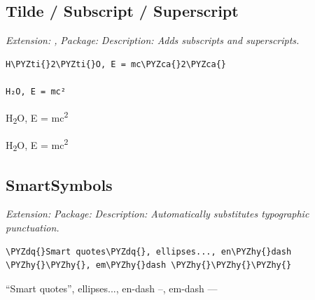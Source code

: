 \documentclass[a4paper,twoside]{article}
\begin{document}
\subsection{Tilde / Subscript / Superscript}
\emph{Extension: , }
\emph{Package: }
\emph{Description: Adds subscripts and superscripts.}
\begin{tscode}[lang=md, engine=pygments]
\begin{Verbatim}[commandchars=\\\{\},breaklines, breakanywhere, commandchars=\\\{\}]
H\PYZti{}2\PYZti{}O, E = mc\PYZca{}2\PYZca{}

H₂O, E = mc²
\end{Verbatim}
\end{tscode}
\begin{displayquote}
H\textsubscript{2}O, E = mc\textsuperscript{2}

H\textsubscript{2}O, E = mc\textsuperscript{2}
\end{displayquote}
\subsection{SmartSymbols}
\emph{Extension: }
\emph{Package: }
\emph{Description: Automatically substitutes typographic punctuation.}
\begin{tscode}[lang=md, engine=pygments]
\begin{Verbatim}[commandchars=\\\{\},breaklines, breakanywhere, commandchars=\\\{\}]
\PYZdq{}Smart quotes\PYZdq{}, ellipses..., en\PYZhy{}dash \PYZhy{}\PYZhy{}, em\PYZhy{}dash \PYZhy{}\PYZhy{}\PYZhy{}
\end{Verbatim}
\end{tscode}
\begin{displayquote}
\enquote{Smart quotes}, ellipses..., en-dash --, em-dash ---
\end{displayquote}
\end{document}

